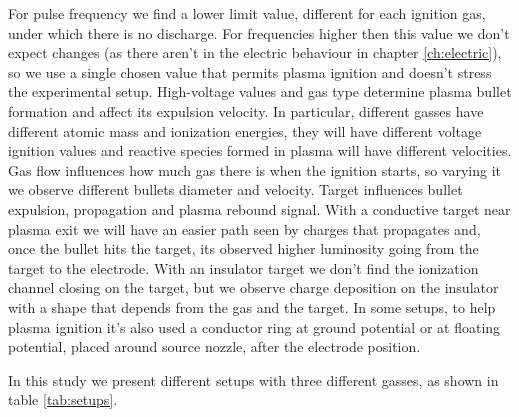 For pulse frequency we find a lower limit value, different for each ignition gas, under which there is no discharge. For frequencies higher then this value we don't expect changes (as there aren't in the electric behaviour in chapter \ref{ch:electric}), so we use a single chosen value that permits plasma ignition and doesn't stress the experimental setup.
High-voltage values and gas type determine plasma bullet formation and affect its expulsion velocity. In particular, different gasses have different atomic mass and ionization energies, they will have different voltage ignition values and reactive species formed in plasma will have different velocities.
Gas flow influences how much gas there is when the ignition starts, so varying it we observe different bullets diameter and velocity.
Target influences bullet expulsion, propagation and plasma rebound signal. With a conductive target near plasma exit we will have an easier path seen by charges that propagates and, once the bullet hits the target, its observed higher luminosity going from the target to the electrode. With an insulator target we don't find the ionization channel closing on the target, but we observe charge deposition on the insulator with a shape that depends from the gas and the target.
In some setups, to help plasma ignition it's also used a conductor ring at ground potential or at floating potential, placed around source nozzle, after the electrode position.


In this study we present different setups with three different gasses, as shown in table \ref{tab:setups}.

